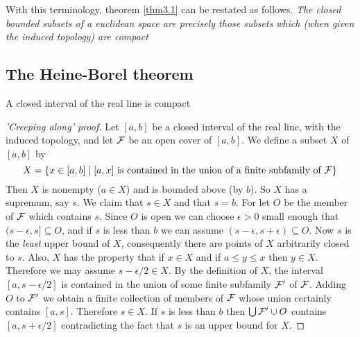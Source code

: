 \documentclass[11pt]{article}
\begin{document}
With this terminology, theorem \ref{thm3.1} can be restated as follows.
\emph{The closed bounded subsets of a euclidean space are precisely those subsets}
\emph{which (when given the induced topology) are compact}

\subsection{The Heine-Borel theorem}
\label{sec:org158d89d}
\begin{theorem}
\label{thm3.3}
A closed interval of the real line is compact
\end{theorem}

\begin{proof}['Creeping along' proof]
Let \([a,b]\) be a closed interval of the real line, with the induced
topology, and let \(\mathcal{F}\) be an open cover of \([a,b]\). We define a subset
\(X\) of \([a,b]\) by
\begin{equation*}
X=\{x\in[a,b]\mid[a,x]\text{ is contained in the union of a finite subfamily of }\mathcal{F}\}
\end{equation*}
Then \(X\) is nonempty (\(a\in X\)) and is bounded above (by \(b\)). So \(X\)
has a supremum, say \(s\). We claim that \(s\in X\) and that \(s=b\). For let
\(O\) be the member of \(\mathcal{F}\) which contains \(s\). Since \(O\) is open we
can choose \(\epsilon>0\) small enough that \((s-\epsilon,s]\subseteq O\), and if
\(s\) is less than \(b\) we can assume \((s-\epsilon,s+\epsilon)\subseteq
   O\). Now \(s\) is the \emph{least} upper bound of \(X\), consequently there are
points of \(X\) arbitrarily closed to \(s\). Also, \(X\) has the property
that if \(x\in X\) and if \(a\le y\le x\) then \(y\in X\). Therefore we may
assume \(s-\epsilon/2\in X\). By the definition of \(X\), the interval
\([a,s-\epsilon/2]\) is contained in the union of some finite subfamily
\(\mathcal{F}'\) of \(\mathcal{F}\). Adding \(O\) to \(\mathcal{F}'\) we obtain a finite
collection of members of \(\mathcal{F}\) whose union certainly contains \([a,s]\).
Therefore \(s\in X\). If \(s\) is less than \(b\) then \(\bigcup\mathcal{F}'\cup
   O\) contains \([a,s+\epsilon/2]\) contradicting the fact that \(s\) is an
upper bound for \(X\).
\end{proof}
\end{document}
